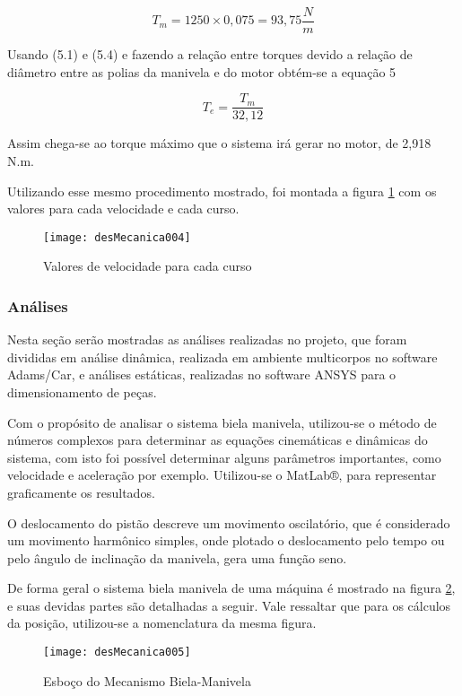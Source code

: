 	
		$$T_{m}= {1250 \times 0,075} = 93,75 {\frac{N}{m}}$$
	

		Usando (5.1) e (5.4) e fazendo a relação entre torques devido a relação de diâmetro entre as polias da manivela e do motor obtém-se a equação 5

		\begin{equation}
			T_{e}= {\frac{T_{m}}{32,12}}
		\end{equation}

		Assim chega-se ao torque máximo que o sistema irá gerar no motor, de 2,918 N.m.

		Utilizando esse mesmo procedimento mostrado, foi montada a figura \ref{desMecanica004} com os valores para cada velocidade e cada curso.

		\begin{figure}[h]
			\centering
			\texttt{[image: desMecanica004]}
			\caption{Valores de velocidade para cada curso}
			\label{desMecanica004}
		\end{figure}

\subsubsection{Análises}
	
	Nesta seção serão mostradas as análises realizadas no projeto, que foram divididas em análise dinâmica, realizada em ambiente multicorpos no software  Adams/Car, e análises estáticas, realizadas no software ANSYS para o dimensionamento de peças. 


		Com o propósito de analisar o sistema biela manivela, utilizou-se o método de números complexos para determinar as equações cinemáticas e dinâmicas do sistema, com isto foi possível determinar alguns parâmetros importantes, como velocidade e aceleração por exemplo. Utilizou-se o MatLab®, para representar graficamente os resultados.

		O deslocamento do pistão descreve um movimento oscilatório, que é considerado um movimento harmônico simples, onde plotado o deslocamento pelo tempo ou pelo ângulo de inclinação da manivela, gera uma função seno.

		De forma geral o sistema biela manivela de uma máquina é mostrado na figura \ref{desMecanica005}, e suas devidas partes são detalhadas a seguir. Vale ressaltar que para os cálculos da posição, utilizou-se a nomenclatura da mesma figura.

		\begin{figure}[!h]
			\centering
			\texttt{[image: desMecanica005]}
			\caption{Esboço do Mecanismo Biela-Manivela}
			\label{desMecanica005}
		\end{figure}

